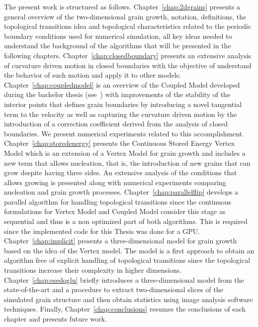 The present work is structured as follows. Chapter~\ref{chap:2dgrains} presents a general overview of the two-dimensional grain growth, notation, definitions, the topological transitions idea and topological characteristics related to the periodic boundary conditions used for numerical simulation, all key ideas needed to understand the background of the algorithms that will be presented in the following chapters.
Chapter~\ref{chap:closedboundary} presents an extensive analysis of curvature driven motion in closed boundaries with the objective of understand the behavior of such motion and apply it to other models. 
Chapter~\ref{chap:coupledmodel} is an overview of the Coupled Model developed during the bachelor thesis (see~\cite{bachelorthesisasazo}) with improvements of the stability of the interior points that defines grain boundaries by introducing a novel tangential term to the velocity as well as capturing the curvature driven motion by the introduction of a correction coefficient derived from the analysis of closed boundaries. 
We present numerical experiments related to this accomplishment.
Chapter~\ref{chap:storedenergy} presents the Continuous Stored Energy Vertex Model which is an extension of a Vertex Model for grain growth and includes a new term that allows nucleation, that is, the introduction of new grains that can grow despite having three sides. 
An extensive analysis of the conditions that allows growing is presented along with numerical experiments comparing nucleation and grain growth processes.
Chapter~\ref{chap:parallelflip} develops a parallel algorithm for handling topological transitions since the continuous formulations for Vertex Model and Coupled Model consider this stage as sequential and thus is a non optimized part of both algorithms. This is required since the implemented code for this Thesis was done for a GPU.
Chapter~\ref{chap:implicit} presents a three-dimensional model for grain growth based on the idea of the Vertex model. The model is a first approach to obtain an algorithm free of explicit handling of topological transitions since the topological transitions increase their complexity in higher dimensions.
Chapter~\ref{chap:esedoglu} briefly introduces a three-dimensional model from the state-of-the-art and a procedure to extract two-dimensional slices of the simulated grain structure and then obtain statistics using image analysis software techniques.
Finally, Chapter~\ref{chap:conclusions} resumes the conclusions of each chapter and presents future work.